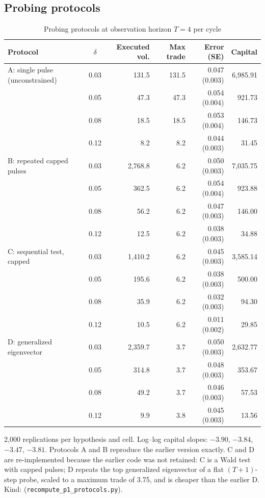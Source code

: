 \subsection{Probing protocols}

\begin{table}[h]\centering\small
\begin{threeparttable}
\caption{Probing protocols at observation horizon $T=4$ per cycle}\label{p1:tab:protocols}
\begin{tabular}{lcrrrr}
\toprule
Protocol & $\delta$ & Executed vol. & Max trade & Error (SE) & Capital\\
\midrule
A: single pulse (unconstrained) & 0.03 & 131.5 & 131.5 & 0.047 (0.003) & 6{,}985.91\\
 & 0.05 & 47.3 & 47.3 & 0.054 (0.004) & 921.73\\
 & 0.08 & 18.5 & 18.5 & 0.053 (0.004) & 146.73\\
 & 0.12 & 8.2 & 8.2 & 0.044 (0.003) & 31.45\\
B: repeated capped pulses & 0.03 & 2{,}768.8 & 6.2 & 0.050 (0.003) & 7{,}035.75\\
 & 0.05 & 362.5 & 6.2 & 0.054 (0.004) & 923.88\\
 & 0.08 & 56.2 & 6.2 & 0.047 (0.003) & 146.00\\
 & 0.12 & 12.5 & 6.2 & 0.038 (0.003) & 34.88\\
C: sequential test, capped & 0.03 & 1{,}410.2 & 6.2 & 0.045 (0.003) & 3{,}585.14\\
 & 0.05 & 195.6 & 6.2 & 0.038 (0.003) & 500.00\\
 & 0.08 & 35.9 & 6.2 & 0.032 (0.003) & 94.30\\
 & 0.12 & 10.5 & 6.2 & 0.011 (0.002) & 29.85\\
D: generalized eigenvector & 0.03 & 2{,}359.7 & 3.7 & 0.050 (0.003) & 2{,}632.77\\
 & 0.05 & 314.8 & 3.7 & 0.048 (0.003) & 353.67\\
 & 0.08 & 49.2 & 3.7 & 0.046 (0.003) & 57.53\\
 & 0.12 & 9.9 & 3.8 & 0.045 (0.003) & 13.56\\
\bottomrule
\end{tabular}
\begin{tablenotes}\footnotesize\item 2{,}000 replications per hypothesis and cell. Log--log capital slopes: $-3.90$, $-3.84$, $-3.47$, $-3.81$. Protocols A and B reproduce the earlier version exactly. C and D are re-implemented because the earlier code was not retained: C is a Wald test with capped pulses; D repeats the top generalized eigenvector of a flat $(T+1)$-step probe, scaled to a maximum trade of 3.75, and is cheaper than the earlier D. Kind:  (\texttt{recompute\_p1\_protocols.py}).\end{tablenotes}
\end{threeparttable}
\end{table}

